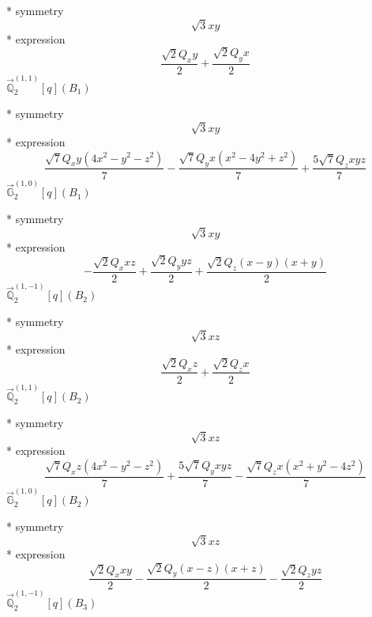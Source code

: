 \documentclass[fleqn,8pt]{jsarticle}
\begin{document}
\noindent\quad ** symmetry
\begin{dmath*}
\sqrt{3} x y
\end{dmath*}
\noindent\quad ** expression
\begin{dmath*}
\frac{\sqrt{2} Q_{x} y}{2} + \frac{\sqrt{2} Q_{y} x}{2}
\end{dmath*}
\noindent\quad $\vec{\mathbb{Q}}_{2}^{(1,1)}[q](B_{1})$

\noindent\quad ** symmetry
\begin{dmath*}
\sqrt{3} x y
\end{dmath*}
\noindent\quad ** expression
\begin{dmath*}
\frac{\sqrt{7} Q_{x} y \left(4 x^{2} - y^{2} - z^{2}\right)}{7} - \frac{\sqrt{7} Q_{y} x \left(x^{2} - 4 y^{2} + z^{2}\right)}{7} + \frac{5 \sqrt{7} Q_{z} x y z}{7}
\end{dmath*}
\noindent\quad $\vec{\mathbb{G}}_{2}^{(1,0)}[q](B_{1})$

\noindent\quad ** symmetry
\begin{dmath*}
\sqrt{3} x y
\end{dmath*}
\noindent\quad ** expression
\begin{dmath*}
- \frac{\sqrt{2} Q_{x} x z}{2} + \frac{\sqrt{2} Q_{y} y z}{2} + \frac{\sqrt{2} Q_{z} \left(x - y\right) \left(x + y\right)}{2}
\end{dmath*}
\noindent\quad $\vec{\mathbb{Q}}_{2}^{(1,-1)}[q](B_{2})$

\noindent\quad ** symmetry
\begin{dmath*}
\sqrt{3} x z
\end{dmath*}
\noindent\quad ** expression
\begin{dmath*}
\frac{\sqrt{2} Q_{x} z}{2} + \frac{\sqrt{2} Q_{z} x}{2}
\end{dmath*}
\noindent\quad $\vec{\mathbb{Q}}_{2}^{(1,1)}[q](B_{2})$

\noindent\quad ** symmetry
\begin{dmath*}
\sqrt{3} x z
\end{dmath*}
\noindent\quad ** expression
\begin{dmath*}
\frac{\sqrt{7} Q_{x} z \left(4 x^{2} - y^{2} - z^{2}\right)}{7} + \frac{5 \sqrt{7} Q_{y} x y z}{7} - \frac{\sqrt{7} Q_{z} x \left(x^{2} + y^{2} - 4 z^{2}\right)}{7}
\end{dmath*}
\noindent\quad $\vec{\mathbb{G}}_{2}^{(1,0)}[q](B_{2})$

\noindent\quad ** symmetry
\begin{dmath*}
\sqrt{3} x z
\end{dmath*}
\noindent\quad ** expression
\begin{dmath*}
\frac{\sqrt{2} Q_{x} x y}{2} - \frac{\sqrt{2} Q_{y} \left(x - z\right) \left(x + z\right)}{2} - \frac{\sqrt{2} Q_{z} y z}{2}
\end{dmath*}
\noindent\quad $\vec{\mathbb{Q}}_{2}^{(1,-1)}[q](B_{3})$
\end{document}
